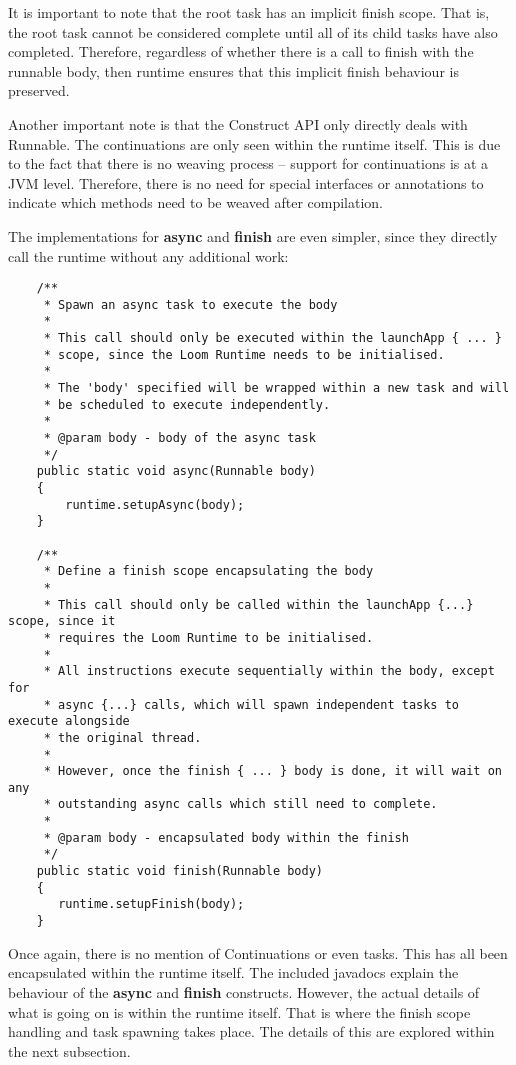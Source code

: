 \documentclass[12pt]{article}
\begin{document}
    It is important to note that the root task has an implicit finish scope. That is, the root task cannot
    be considered complete until all of its child tasks have also completed. Therefore, regardless of whether
    there is a call to finish with the runnable body, then runtime ensures that this implicit finish behaviour
    is preserved.

    Another important note is that the Construct API only directly deals with Runnable. The continuations are
    only seen within the runtime itself. This is due to the fact that there is no weaving process -- support
    for continuations is at a JVM level. Therefore, there is no need for special interfaces or annotations
    to indicate which methods need to be weaved after compilation. 

    The implementations for \textbf{async} and \textbf{finish} are even simpler, since they directly call the
    runtime without any additional work:

    \begin{lstlisting}
    /**
     * Spawn an async task to execute the body
     *
     * This call should only be executed within the launchApp { ... }
     * scope, since the Loom Runtime needs to be initialised.
     *
     * The 'body' specified will be wrapped within a new task and will
     * be scheduled to execute independently.
     *
     * @param body - body of the async task
     */
    public static void async(Runnable body)
    {
        runtime.setupAsync(body);
    }

    /**
     * Define a finish scope encapsulating the body
     *
     * This call should only be called within the launchApp {...} scope, since it
     * requires the Loom Runtime to be initialised.
     *
     * All instructions execute sequentially within the body, except for 
     * async {...} calls, which will spawn independent tasks to execute alongside
     * the original thread. 
     *
     * However, once the finish { ... } body is done, it will wait on any 
     * outstanding async calls which still need to complete.
     *
     * @param body - encapsulated body within the finish
     */
    public static void finish(Runnable body)
    {
       runtime.setupFinish(body);
    }
    \end{lstlisting}

    Once again, there is no mention of Continuations or even tasks. This has all been encapsulated within the
    runtime itself. The included javadocs explain the behaviour of the \textbf{async} and \textbf{finish}
    constructs. However, the actual details of what is going on is within the runtime itself. That is where
    the finish scope handling and task spawning takes place. The details of this are explored within the next
    subsection.
\end{document}
